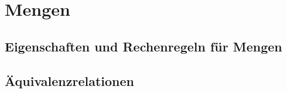 \section{Mengen}

\subsection{Eigenschaften und Rechenregeln für Mengen}

\subsection{Äquivalenzrelationen}
